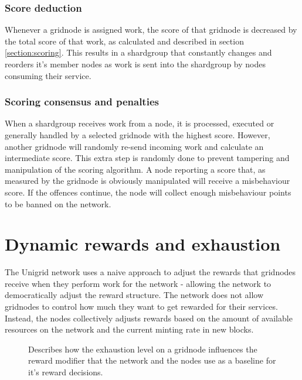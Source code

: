 \documentclass[10pt,a4paper,final]{article}
\begin{document}
\subsubsection{Score deduction}
Whenever a \gls{gridnode} is assigned work, the score of that \gls{gridnode} is decreased by the total score of that work, as calculated and described in section \ref{section:scoring}. This results in a \gls{shardgroup} that constantly changes and reorders it's member nodes as work is sent into the \gls{shardgroup} by nodes consuming their service.

\subsubsection{Scoring consensus and penalties}
When a \gls{shardgroup} receives work from a node, it is processed, executed or generally handled by a selected \gls{gridnode} with the highest score. However, another \gls{gridnode} will randomly re-send incoming work and calculate an intermediate score. This extra step is randomly done to prevent tampering and manipulation of the scoring algorithm. A node reporting a score that, as measured by the \gls{gridnode} is obviously manipulated will receive a misbehaviour score. If the offences continue, the node will collect enough misbehaviour points to be banned on the network.

\section{Dynamic rewards and exhaustion}
\label{section:dynreward}
The Unigrid network uses a naive approach to adjust the rewards that \glspl{gridnode} receive when they perform work for the network - allowing the network to democratically adjust the reward structure. The network does not allow \glspl{gridnode} to control how much they want to get rewarded for their services. Instead, the nodes collectively adjusts rewards based on the amount of available resources on the network and the current minting rate in new blocks.

\begin{figure}[htb]
	\centering
		\caption{Describes how the exhaustion level on a \gls{gridnode} influences the reward modifier that the network and the nodes use as a baseline for it's reward decisions.}
\end{figure}
\end{document}
